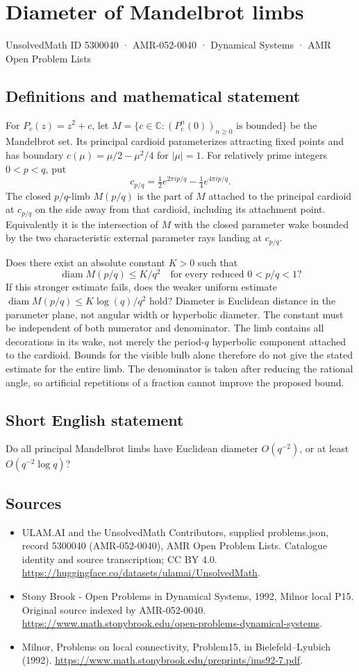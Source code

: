 \documentclass[11pt,a4paper]{article}
\begin{document}
\section*{Diameter of Mandelbrot limbs}\label{5300040}
{\small UnsolvedMath ID 5300040 · AMR-052-0040 · Dynamical Systems · AMR Open Problem Lists}
\subsection{Definitions and mathematical statement}
For $P_c(z)=z^2+c$, let
$M=\{c\in\mathbb C:(P_c^n(0))_{n\ge0}\text{ is bounded}\}$
be the Mandelbrot set. Its principal cardioid parameterizes attracting
fixed points and has boundary
$c(\mu)=\mu/2-\mu^2/4$ for $|\mu|=1$.
For relatively prime integers $0<p<q$, put
\[
 c_{p/q}=\tfrac12e^{2\pi ip/q}-\tfrac14e^{4\pi ip/q}.
\]
The closed $p/q$-limb $M(p/q)$ is the part of $M$ attached to the
principal cardioid at $c_{p/q}$ on the side away from that cardioid,
including its attachment point. Equivalently it is the intersection
of $M$ with the closed parameter wake bounded by the two characteristic
external parameter rays landing at $c_{p/q}$.

Does there exist an absolute constant $K>0$ such that
\[
 \operatorname{diam}M(p/q)\le K/q^2
 \quad\text{for every reduced }0<p/q<1?
\]
If this stronger estimate fails, does the weaker uniform estimate
$\operatorname{diam}M(p/q)\le K\log(q)/q^2$ hold?
Diameter is Euclidean distance in the parameter plane, not angular
width or hyperbolic diameter. The constant must be independent of
both numerator and denominator. The limb contains all decorations
in its wake, not merely the period-$q$ hyperbolic component attached
to the cardioid. Bounds for the visible bulb alone therefore do not
give the stated estimate for the entire limb. The denominator is taken
after reducing the rational angle, so artificial repetitions of a fraction
cannot improve the proposed bound.
\subsection{Short English statement}
Do all principal Mandelbrot limbs have Euclidean diameter $O(q^{-2})$, or at least $O(q^{-2}\log q)$?
\subsection{Sources}
\begin{itemize}
\item[S1] ULAM.AI and the UnsolvedMath Contributors, supplied problems.json, record 5300040 (AMR-052-0040), AMR Open Problem Lists. Catalogue identity and source transcription; CC BY 4.0.
\url{https://huggingface.co/datasets/ulamai/UnsolvedMath}.
\item[S2] Stony Brook - Open Problems in Dynamical Systems, 1992, Milnor local P15. Original source indexed by AMR-052-0040.
\url{https://www.math.stonybrook.edu/open-problems-dynamical-systems}.
\item[S3] Milnor, Problems on local connectivity, Problem15, in Bielefeld–Lyubich (1992).
\url{https://www.math.stonybrook.edu/preprints/ims92-7.pdf}.
\end{itemize}
\end{document}
